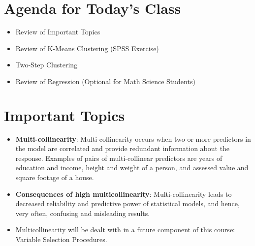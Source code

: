 \documentclass[a4paper,12pt]{article}
\begin{document}
\tableofcontents
\section{Agenda for Today's Class}

\begin{itemize}
	\item Review of Important Topics
	\item Review of K-Means Clustering (SPSS Exercise)
	\item Two-Step Clustering
	\item Review of Regression (Optional for Math Science Students)
\end{itemize}

\section{Important Topics}

\begin{itemize}
	\item \textbf{Multi-collinearity}: Multi-collinearity occurs when two or more predictors in the model are
	correlated and provide redundant information about the response. Examples of pairs of multi-collinear predictors are years of education and income, height and weight of a person, and assessed value and square footage
	of a house.
	
	\item \textbf{Consequences of high multicollinearity}:
	Multi-collinearity leads to decreased reliability and predictive power of statistical models, and hence, very often, confusing and misleading results.
	\item Multicollinearity will be dealt with in a future component of this course: Variable Selection Procedures.
\end{itemize}
\end{document}
